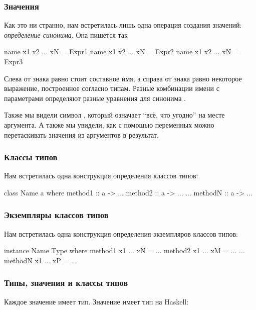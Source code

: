 \subsubsection{Значения}

Как это ни странно, нам встретилась лишь одна операция создания
значений: \emph{определение синонима}. Она пишется так


\begin{code}
name x1  x2 ... xN = Expr1
name x1  x2 ... xN = Expr2
name x1  x2 ... xN = Expr3
\end{code}

Слева от знака равно стоит составное имя, а справа от знака равно
некоторое выражение, построенное согласно типам. Разные комбинации имени
 с параметрами определяют разные уравнения для синонима
.

Также мы видели символ \In{_}, который означает ``всё, что угодно'' на
месте аргумента. А также мы увидели, как с помощью переменных можно
перетаскивать значения из аргументов в результат.

\subsubsection{Классы типов}

Нам встретилась одна конструкция определения классов типов:


\begin{code}
class Name a where
    method1 :: a -> ...
    method2 :: a -> ...
    ...
    methodN :: a -> ...
\end{code}

\subsubsection{Экземпляры классов типов}

Нам встретилась одна конструкция определения экземпляров классов типов:


\begin{code}
instance Name Type where
    method1 x1 ... xN = ...
    method2 x1 ... xM = ...
    ...
    methodN x1 ... xP = ...
\end{code}

\subsubsection{Типы, значения и классы типов}

Каждое значение имеет тип. Значение  имеет тип  на Haskell:


